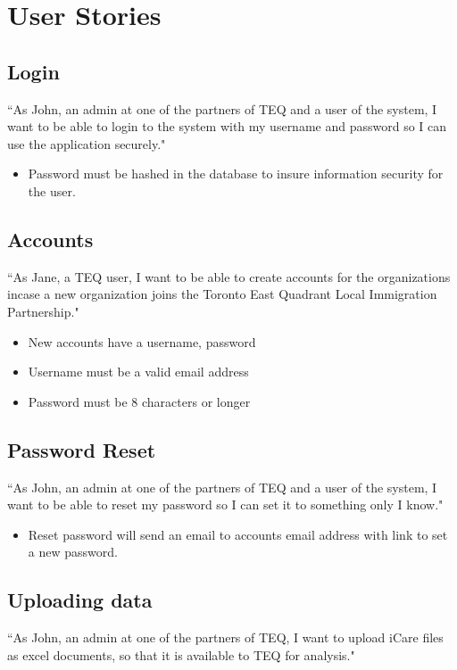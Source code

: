 \documentclass[12pt]{article}
\begin{document}
\pagebreak

\section{User Stories}
\subsection{Login} ``As John, an admin at one of the partners of TEQ and a user of the system, I want to be able to login to the system with my username and password so I can use the application securely."
\begin{itemize}
\item Password must be hashed in the database to insure information security for the user.
\end{itemize}

\subsection{Accounts} ``As Jane, a TEQ user, I want to be able to create accounts for the organizations incase a new organization joins the Toronto East Quadrant Local Immigration Partnership."
\begin{itemize}
\item New accounts have a username, password
\item Username must be a valid email address
\item Password must be 8 characters or longer

\end{itemize}

\subsection{Password Reset}
``As John, an admin at one of the partners of TEQ and a user of the system, I want to be able to reset my password so I can set it to something only I know."
\begin{itemize}
\item Reset password will send an email to accounts email address with link to set a new password.

\end{itemize}

\subsection{Uploading data}
``As John, an admin at one of the partners of TEQ, I want to upload iCare files as excel documents, so that it is available to TEQ for analysis."
\end{document}
